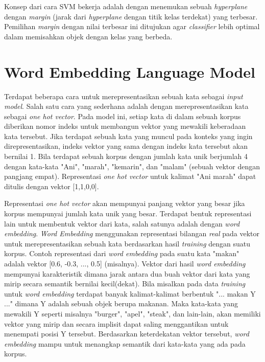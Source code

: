 Konsep dari cara SVM bekerja adalah dengan menemukan sebuah \textit{hyperplane} dengan \textit{margin} (jarak dari \textit{hyperplane} dengan titik kelas terdekat) yang terbesar. Pemilihan \textit{margin} dengan nilai terbesar ini ditujukan agar \textit{classifier} lebih optimal dalam memisahkan objek dengan kelas yang berbeda.

\section{Word Embedding Language Model}
Terdapat beberapa cara untuk merepresentasikan sebuah kata sebagai \textit{input model}. Salah satu cara yang sederhana adalah dengan merepresentasikan kata sebagai \textit{one hot vector}. Pada model ini, setiap kata di dalam sebuah korpus diberikan nomor indeks untuk membangun vektor yang mewakili keberadaan kata tersebut. Jika terdapat sebuah kata yang muncul pada konteks yang ingin direpresentasikan, indeks vektor yang sama dengan indeks kata tersebut akan bernilai 1. Bila terdapat sebuah korpus dengan jumlah kata unik berjumlah 4 dengan kata-kata "Ani", "marah", "kemarin", dan "malam" (sebuah vektor dengan pangjang empat). Representasi \textit{one hot vector} untuk kalimat "Ani marah" dapat ditulis dengan vektor [1,1,0,0].

Representasi \textit{one hot vector} akan mempunyai panjang vektor yang besar jika korpus mempunyai jumlah kata unik yang besar. Terdapat bentuk representasi lain untuk membentuk vektor dari kata, salah satunya adalah dengan \textit{word embedding}. \textit{Word Embedding} menggunakan representasi bilangan \textit{real} pada vektor untuk merepresentasikan sebuah kata berdasarkan hasil \textit{training} dengan suatu korpus. Contoh representasi dari \textit{word embedding} pada suatu kata "makan" adalah vektor [0.6, -0.3, ..., 0.5] (misalnya). Vektor dari hasil \textit{word embedding} mempunyai karakteristik dimana jarak antara dua buah vektor dari kata yang mirip secara semantik bernilai kecil(dekat). Bila misalkan pada data \textit{training} untuk \textit{word embedding} terdapat banyak kalimat-kalimat berbentuk "... makan Y ..." dimana Y adalah sebuah objek berupa makanan. Maka kata-kata yang mewakili Y seperti misalnya "burger", "apel", "steak", dan lain-lain, akan memiliki vektor yang mirip dan secara implisit dapat saling menggantikan untuk menempati posisi Y tersebut. Berdasarkan keterdekatan vektor tersebut, \textit{word embedding} mampu untuk menangkap semantik dari kata-kata yang ada pada korpus.

